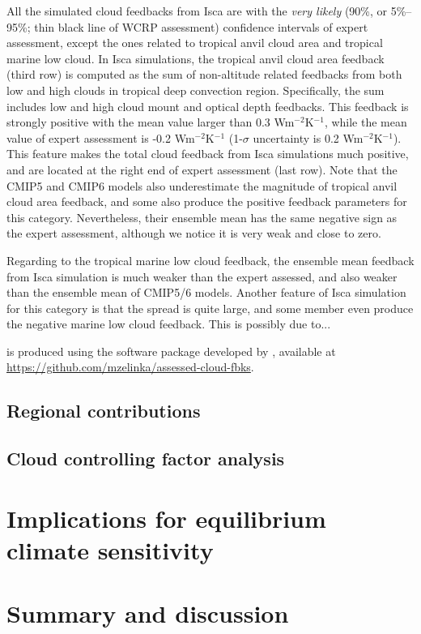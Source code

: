 All the simulated cloud feedbacks from Isca are with the \textit{very likely} (90\%, or 5\%--95\%; thin black line of WCRP assessment) confidence intervals of expert assessment, except the ones related to tropical anvil cloud area and tropical marine low cloud. In Isca simulations, the tropical anvil cloud area feedback (third row) is computed as the sum of non-altitude related feedbacks from both low and high clouds in tropical deep convection region. Specifically, the sum includes low and high cloud mount and optical depth feedbacks. This feedback is strongly positive with the mean value larger than 0.3 Wm$^{-2}$K$^{-1}$, while the mean value of expert assessment is -0.2 Wm$^{-2}$K$^{-1}$ (1-$\sigma$ uncertainty is 0.2 Wm$^{-2}$K$^{-1}$). This feature makes the total cloud feedback from Isca simulations much positive, and are located at the right end of expert assessment (last row). Note that the CMIP5 and CMIP6 models also underestimate the magnitude of tropical anvil cloud area feedback, and some also produce the positive feedback parameters for this category. Nevertheless, their ensemble mean has the same negative sign as the expert assessment, although we notice it is very weak and close to zero. 

Regarding to the tropical marine low cloud feedback, the ensemble mean feedback from Isca simulation is much weaker than the expert assessed, and also weaker than the ensemble mean of CMIP5/6 models. Another feature of Isca simulation for this category is that the spread is quite large, and some member even produce the negative marine low cloud feedback. This is possibly due to...


 is produced using the software package developed by \cite{Zelinka2021evaluating}, available at \url{https://github.com/mzelinka/assessed-cloud-fbks}.

\subsection{Regional contributions}
\label{sec:reg_contri_to_spread_of_cldfbk}

\subsection{Cloud controlling factor analysis}
\label{sec:cld_control_factor}


\section{Implications for equilibrium climate sensitivity}
\label{sec:implification_for_ECS}


\section{Summary and discussion}